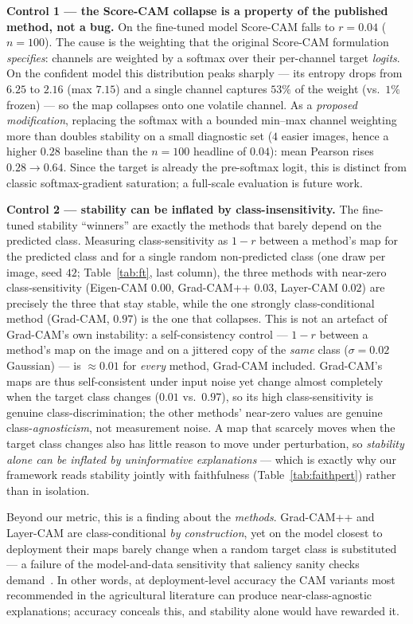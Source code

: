 \documentclass[runningheads]{llncs}
\begin{document}
\noindent\textbf{Control 1 --- the Score-CAM collapse is a property of the
published method, not a bug.} On the fine-tuned model Score-CAM falls to
$r\!=\!0.04$ ($n{=}100$). The cause is the weighting that the original Score-CAM
formulation \emph{specifies}: channels are weighted by a softmax over their
per-channel target \emph{logits}. On the confident model this distribution peaks
sharply --- its entropy drops from $6.25$ to $2.16$ (max $7.15$) and a single
channel captures $53\%$ of the weight (vs.\ $1\%$ frozen) --- so the map collapses
onto one volatile channel. As a \emph{proposed modification}, replacing the softmax
with a bounded min--max channel weighting more than doubles stability on a small
diagnostic set ($4$ easier images, hence a higher $0.28$ baseline than the $n{=}100$
headline of $0.04$): mean Pearson rises $0.28\!\to\!0.64$. Since the target is
already the pre-softmax logit, this is distinct from classic softmax-gradient
saturation; a full-scale evaluation is future work.

\noindent\textbf{Control 2 --- stability can be inflated by class-insensitivity.}
The fine-tuned stability ``winners'' are exactly the methods that barely depend on
the predicted class. Measuring class-sensitivity as $1-r$ between a method's map for
the predicted class and for a single random non-predicted class (one draw per image,
seed $42$; Table~\ref{tab:ft}, last column), the three methods with near-zero
class-sensitivity (Eigen-CAM $0.00$, Grad-CAM++ $0.03$, Layer-CAM $0.02$) are
precisely the three that stay stable, while the one strongly class-conditional method
(Grad-CAM, $0.97$) is the one that collapses. This is not an artefact of Grad-CAM's
own instability: a self-consistency control --- $1-r$ between a method's map on the
image and on a jittered copy of the \emph{same} class ($\sigma{=}0.02$ Gaussian) ---
is $\approx0.01$ for \emph{every} method, Grad-CAM included. Grad-CAM's maps are thus
self-consistent under input noise yet change almost completely when the target class
changes ($0.01$ vs.\ $0.97$), so its high class-sensitivity is genuine
class-discrimination; the other methods' near-zero values are genuine
class-\emph{agnosticism}, not measurement noise. A map that
scarcely moves when the target class changes also has little reason to move under
perturbation, so \emph{stability alone can be inflated by uninformative
explanations} --- which is exactly why our framework reads stability jointly with
faithfulness (Table~\ref{tab:faithpert}) rather than in isolation.

\noindent Beyond our metric, this is a finding about the \emph{methods}. Grad-CAM++
and Layer-CAM are class-conditional \emph{by construction}, yet on the model closest
to deployment their maps barely change when a random target class is substituted ---
a failure of the model-and-data sensitivity that saliency sanity checks
demand~\cite{adebayo2018sanity}. In other words, at deployment-level accuracy the
CAM variants most recommended in the agricultural literature can produce
near-class-agnostic explanations; accuracy conceals this, and stability alone would
have rewarded it.
\end{document}
